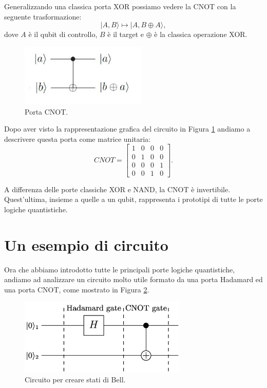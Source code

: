Generalizzando una classica porta XOR possiamo vedere la CNOT con la seguente trasformazione:
\begin{equation}
    |A,B\rangle\mapsto|A, B\oplus A\rangle,
\end{equation}
dove $A$ è il qubit di controllo, $B$ è il target e $\oplus$ è la classica operazione XOR.
\begin{figure}[htp]
    \centering
    \includegraphics[width=6cm]{Images/Capitolo2/porta_cnot.png}
    \caption{Porta CNOT.}
    \label{fig:porta_cnot}
\end{figure}

Dopo aver visto la rappresentazione grafica del circuito in Figura \ref{fig:porta_cnot} andiamo a descrivere questa porta come matrice unitaria:
\begin{equation}
    CNOT= 
    \begin{bmatrix}
        1 & 0 & 0 & 0\\
        0 & 1 & 0 & 0\\
        0 & 0 & 0 & 1\\
        0 & 0 & 1 & 0
    \end{bmatrix}.
\end{equation}

A differenza delle porte classiche XOR e NAND, la CNOT è invertibile.
Quest'ultima, insieme a quelle a un qubit, rappresenta i prototipi di tutte le porte logiche quantistiche.

\section{Un esempio di circuito}
Ora che abbiamo introdotto tutte le principali porte logiche quantistiche, andiamo ad analizzare un circuito molto utile formato da una porta Hadamard ed una porta CNOT, come mostrato in Figura \ref{fig:circuito_bell}.
\begin{figure}[htp]
    \centering
    \includegraphics[width=8cm]{Images/Capitolo2/circuito_bell.png}
    \caption{Circuito per creare stati di Bell.}
    \label{fig:circuito_bell}
\end{figure}

